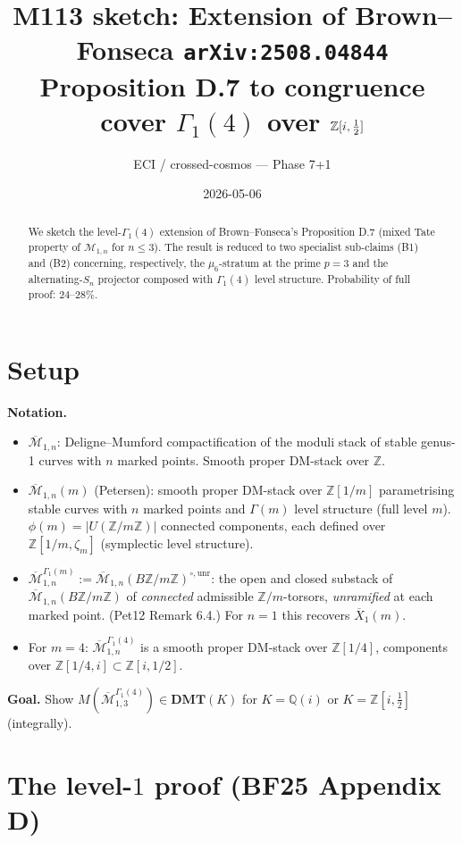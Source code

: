\documentclass[11pt]{article}
\title{M113 sketch: Extension of Brown--Fonseca \texttt{arXiv:2508.04844}\\
Proposition D.7 to congruence cover $\Gamma_1(4)$ over $\Z[i,\tfrac{1}{2}]$}
\author{ECI / crossed-cosmos --- Phase 7+1}
\date{2026-05-06}
\theoremstyle{definition}
\newcommand{\MM}{\overline{\mathcal{M}}}
\newcommand{\Mo}{\mathcal{M}}
\newcommand{\Z}{\mathbb{Z}}
\newcommand{\Q}{\mathbb{Q}}
\newcommand{\DMT}{\mathbf{DMT}}
\begin{document}
\maketitle

\begin{abstract}
We sketch the level-$\Gamma_1(4)$ extension of Brown--Fonseca's
Proposition D.7 (mixed Tate property of $\Mo_{1,n}$ for $n\le 3$).
The result is reduced to two specialist sub-claims (B1) and (B2)
concerning, respectively, the $\mu_6$-stratum at the prime $p=3$
and the alternating-$S_n$ projector composed with $\Gamma_1(4)$
level structure. Probability of full proof: $24$--$28\%$.
\end{abstract}

\section{Setup}

\textbf{Notation.}
\begin{itemize}
\item $\MM_{1,n}$: Deligne--Mumford compactification of the moduli stack of stable
       genus-1 curves with $n$ marked points. Smooth proper DM-stack over $\Z$.
\item $\MM_{1,n}(m)$ (Petersen): smooth proper DM-stack over $\Z[1/m]$
       parametrising stable curves with $n$ marked points and $\Gamma(m)$ level structure
       (full level $m$). $\phi(m) = |U(\Z/m\Z)|$ connected components, each defined
       over $\Z[1/m,\zeta_m]$ (symplectic level structure).
\item $\MM_{1,n}^{\Gamma_1(m)} := \MM_{1,n}(B\Z/m\Z)^{\circ,\mathrm{unr}}$:
       the open and closed substack of $\MM_{1,n}(B\Z/m\Z)$ of \emph{connected} admissible
       $\Z/m$-torsors, \emph{unramified} at each marked point. (Pet12 Remark 6.4.)
       For $n=1$ this recovers $\overline{X}_1(m)$.
\item For $m=4$: $\MM_{1,n}^{\Gamma_1(4)}$ is a smooth proper DM-stack over $\Z[1/4]$,
       components over $\Z[1/4, i]\subset \Z[i, 1/2]$.
\end{itemize}

\textbf{Goal.} Show $M(\MM_{1,3}^{\Gamma_1(4)}) \in \DMT(K)$ for $K=\Q(i)$ or
$K=\Z[i,\tfrac{1}{2}]$ (integrally).

\section{The level-$1$ proof (BF25 Appendix D)}
\end{document}
